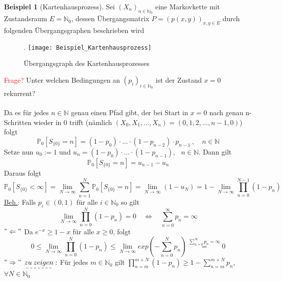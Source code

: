 \documentclass[a4paper,12pt]{scrartcl}
\theoremstyle{definition}
\newtheorem{bsp}{Beispiel}[section]
\begin{document}
\begin{bsp}[Kartenhausprozess]
Sei $(X_{n})_{n \in \mathbb{N}_{0}}$ eine Markovkette mit Zustandsraum $E = \mathbb{N}_{0}$, dessen Übergangsmatrix $P = (p(x,y))_{x,y \in E}$ durch folgenden Übergangsgraphen beschrieben wird
\begin{figure}[H].
\centering
\texttt{[image: Beispiel\_Kartenhausprozess]}
\caption{Übergangsgraph des Kartenhausprozesses}
\end{figure}
\noindent
\textcolor{red}{Frage?} Unter welchen Bedingungen an $(p_{i})_{i \in \mathbb{N}_{0}}$ ist der Zustand $x=0$ rekurrent?
\\
\\
Da es für jedes $n \in \mathbb{N}$ genau einen Pfad gibt, der bei Start in $x=0$ nach genau n-Schritten wieder in 0 trifft (nämlich $(X_{0},X_{1},...,X_{n}) = (0,1,2,...,n-1,0)$) folgt
\begin{equation*}
\mathbb{P}_{0} [S_{\lbrace 0 \rbrace} = n] = (1-p_{0}) \cdot ... \cdot (1-p_{n-2}) \cdot p_{n-1} \: , \quad n \in \mathbb{N}
\end{equation*} 
Setze nun $u_{0} := 1$ und $u_{n} = (1-p_{0}) \cdot ... \cdot (1-p_{n-1})$, $\:$ $n \in \mathbb{N}$. Dann gilt
\begin{equation*}
\mathbb{P}_{0} [S_{\lbrace 0 \rbrace} = n] = u_{n-1} - u_{n}
\end{equation*}
Daraus folgt
\begin{equation*}
\mathbb{P}_{0} [S_{\lbrace 0 \rbrace} < \infty] = \lim_{N \to \infty} \sum_{n=1}^{N} \mathbb{P}_{0} [S_{\lbrace 0 \rbrace} = n] = \lim_{N \to \infty}(1-u_{N}) = 1 - \lim_{N \to \infty } \prod_{n=0}^{N-1}  (1 - p_{n})
\end{equation*}
\underline{Beh.}: Falls $p_{i} \in (0,1)$ für alle $i \in \mathbb{N}_{0}$ so gilt
\begin{equation*}
\lim_{N \to \infty} \prod_{n=0}^{N} (1-p_{n}) = 0 \quad \Leftrightarrow \quad \sum_{n=0}^{\infty} p_{n} = \infty
\end{equation*}
$"\Leftarrow"$ Da $e^{-x} \geq 1-x$ für alle $x \geq 0$, folgt
\begin{equation*}
0 \leq \lim_{N \to \infty} \prod_{n=0}^{N} (1-p_{n}) \leq \lim_{N \to \infty} exp(-\sum_{n=0}^{N}p_{n}) \stackrel{\sum_{n=0}^{\infty}p_{n} = \infty}{=} 0
\end{equation*}
$"\Rightarrow"$ $\dashuline{zu \: zeigen}:$ Für jedes $m \in \mathbb{N}_{0}$ gilt $\prod_{n=m}^{m+N}(1-p_{n}) \geq 1 - \sum_{n=m}^{m+N}p_{n}$, $\forall N \in \mathbb{N}_{0}$
\\

\end{bsp}
\end{document}
